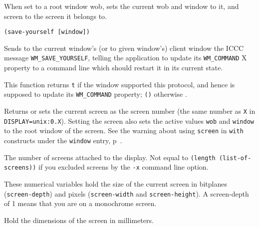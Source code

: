 When set to a root window wob, sets the current wob and window to it,
and screen to the screen it belongs to.
 

{\usagefont\begin{verbatim}
(save-yourself [window])
\end{verbatim}}\usageupspace

Sends to the current window's (or to given window's) client window 
the ICCC message \verb"WM_SAVE_YOURSELF", telling the
application to update its \verb"WM_COMMAND" X property to a command line
which should restart it in its current state.

This function returns \verb"t" if the window supported this protocol, and
hence is supposed to update its \verb"WM_COMMAND" property; \verb"()"
otherwise .



Returns or sets the current screen as the screen number (the same number as
\verb"X" in \verb"DISPLAY=unix:0.X"). Setting the screen also sets the
active values \verb"wob" and \verb"window" to the root window of the screen.
See the warning about using {\tt screen} in {\tt with} constructs under the
{\tt window} entry, p~\pageref{window}.



\sloppy The number of screens attached to the display. Not equal to
\verb"(length (list-of-screens))" if you excluded screens by the \verb"-x"
command line option.

        

These numerical variables hold the size of the current screen in bitplanes
(\verb"screen-depth") and pixels (\verb"screen-width" and
\verb"screen-height"). A screen-depth of 1 means that you are on a
monochrome screen.



Hold the dimensions of the screen in millimeters.

